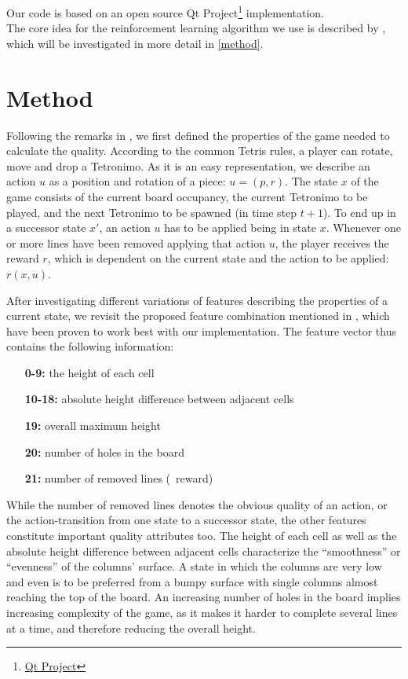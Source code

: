 \documentclass{ml}
\begin{document}
Our code is based on an open source Qt Project\footnote{\href{https://qt-project.org/doc/qt-4.8/widgets-tetrix.html}{Qt Project}} implementation. \\
The core idea for the reinforcement learning algorithm we use is described by \cite{zucker2009learning}, which will be investigated in more detail in \autoref{method}.


\section{Method}
\label{method}

Following the remarks in \cite{zucker2009learning}, we first defined the properties of the game needed to calculate the quality.
According to the common Tetris rules, a player can rotate, move and drop a Tetronimo. As it is an easy representation, we describe an action $u$ as a position and rotation of a piece: $u = (p,r)$. The state $x$ of the game consists of the current board occupancy, the current Tetronimo to be played, and the next Tetronimo to be spawned (in time step $t+1$). 
To end up in a successor state $x'$, an action $u$ has to be applied being in state $x$. 
Whenever one or more lines have been removed applying that action $u$, the player receives the reward $r$, which is dependent on the current state and the action to be applied: $r(x,u)$.

After investigating different variations of features describing the properties of a current state, we revisit the proposed feature combination mentioned in \cite{zucker2009learning}, which have been proven to work best with our implementation. 
The feature vector thus contains the following information:
\begin{enumerate}
	\item[\textbf{0-9:}] the height of each cell
	\item[\textbf{10-18:}] absolute height difference between adjacent cells
	\item[\textbf{19:}] overall maximum height 
	\item[\textbf{20:}] number of holes in the board
	\item[\textbf{21:}] number of removed lines (\Corresponds~reward)
\end{enumerate}
While the number of removed lines denotes the obvious quality of an action, or the action-transition from one state to a successor state, the other features constitute important quality attributes too. 
The height of each cell as well as the absolute height difference between adjacent cells characterize the ``smoothness'' or ``evenness'' of the columns' surface. 
A state in which the columns are very low and even is to be preferred from a bumpy surface with single columns almost reaching the top of the board. 
An increasing number of holes in the board implies increasing complexity of the game, as it makes it harder to complete several lines at a time, and therefore reducing the overall height. 
\end{document}
